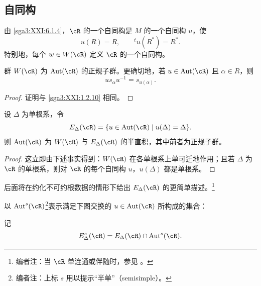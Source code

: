 \subsection{自同构}\label{sga3:XXI:6.7}

由 \ref{sga3:XXI:6.1.4}，\(\cR\) 的一个自同构是 \(M\) 的一个自同构 \(u\)，使
\[
 u(R)=R,
 \qquad
 {}^tu(R^\ast)=R^\ast.
\]
特别地，每个 \(w\in W(\cR)\) 定义 \(\cR\) 的一个自同构。

\begin{lemma}\label{sga3:XXI:6.7.1}
群 \(W(\cR)\) 为 \(\operatorname{Aut}(\cR)\) 的正规子群。更确切地，若 \(u\in\operatorname{Aut}(\cR)\) 且 \(\alpha\in R\)，则
\[
 us_\alpha u^{-1}=s_{u(\alpha)}.
\]
\end{lemma}

\begin{proof}
证明与 \ref{sga3:XXI:1.2.10} 相同。
\end{proof}

\begin{proposition}\label{sga3:XXI:6.7.2}
设 \(\Delta\) 为单根系，令
\[
 E_\Delta(\cR)=
 \{u\in\operatorname{Aut}(\cR)\mid u(\Delta)=\Delta\}.
\]
则 \(\operatorname{Aut}(\cR)\) 为 \(W(\cR)\) 与 \(E_\Delta(\cR)\) 的半直积，其中前者为正规子群。
\end{proposition}

\begin{proof}
这立即由下述事实得到：\(W(\cR)\) 在各单根系上单可迁地作用；且若 \(\Delta\) 为 \(\cR\) 的单根系，则对 \(\cR\) 的每个自同构 \(u\)，\(u(\Delta)\) 都是单根系。
\end{proof}

后面将在约化不可约根数据的情形下给出 \(E_\Delta(\cR)\) 的更简单描述。\footnote{编者注：当 \(\cR\) 单连通或伴随时，参见 。}

\begin{definition}\label{sga3:XXI:6.7.3}
以 \(\operatorname{Aut}^{s}(\cR)\)\footnote{编者注：上标 \(s\) 用以提示“半单”（semisimple）。}表示满足下图交换的 \(u\in\operatorname{Aut}(\cR)\) 所构成的集合：
\begin{center}
\end{center}
记
\[
 E_\Delta^{s}(\cR)
 =E_\Delta(\cR)\cap\operatorname{Aut}^{s}(\cR).
\]
\end{definition}


